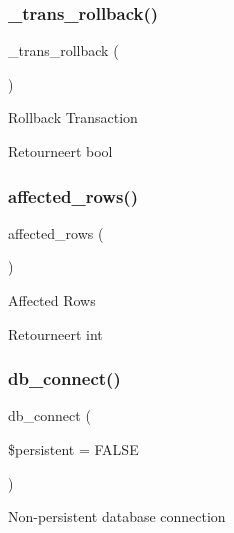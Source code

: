 \subsubsection{\texorpdfstring{\_trans\_rollback()}{\_trans\_rollback()}}
{\footnotesize\ttfamily \+\_\+trans\+\_\+rollback (\begin{DoxyParamCaption}{ }\end{DoxyParamCaption})\hspace{0.3cm}{\ttfamily [protected]}}

Rollback Transaction

\begin{DoxyReturn}{Retourneert}
bool 
\end{DoxyReturn}
\mbox{\label{class_c_i___d_b__mysql__driver_a77248aaad33eb132c04cc4aa3f4bc8cb}} 
\subsubsection{\texorpdfstring{affected\_rows()}{affected\_rows()}}
{\footnotesize\ttfamily affected\+\_\+rows (\begin{DoxyParamCaption}{ }\end{DoxyParamCaption})}

Affected Rows

\begin{DoxyReturn}{Retourneert}
int 
\end{DoxyReturn}
\mbox{\label{class_c_i___d_b__mysql__driver_a52bf595e79e96cc0a7c907a9b45aeb4d}} 
\subsubsection{\texorpdfstring{db\_connect()}{db\_connect()}}
{\footnotesize\ttfamily db\+\_\+connect (\begin{DoxyParamCaption}\item[{}]{\$persistent = {\ttfamily FALSE} }\end{DoxyParamCaption})}

Non-\/persistent database connection


